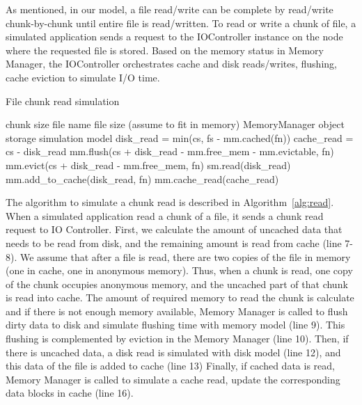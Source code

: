 \documentclass[conference]{IEEEtran}
\newcommand{\Desc}[2]{\State \makebox[2em][l]{#1}#2}
\begin{document}
			As mentioned, in our model, a file read/write can be complete by read/write 
			chunk-by-chunk until entire file is read/written.
			To read or write a chunk of file, a simulated application sends a request to the 
			IOController instance on the node where the requested file is stored.
			Based on the memory status in Memory Manager, the IOController 
			orchestrates cache and disk reads/writes, flushing, cache eviction 
			to simulate I/O time.
			
			\begin{algorithm}\caption{File chunk read simulation}\label{alg:read}
				\small
				\begin{algorithmic}[1]
					\Input
        				\Desc{cs}{chunk size}
        				\Desc{fn}{file name}
        				\Desc{fs}{file size (assume to fit in memory)}
						\Desc{mm}{MemoryManager object}
						\Desc{sm}{storage simulation model}
   					\EndInput
   					\State disk\_read = min(cs, fs - mm.cached(fn))
   					\State cache\_read = cs - disk\_read
					\State mm.flush(cs + disk\_read - mm.free\_mem - mm.evictable, fn) 
					\State mm.evict(cs + disk\_read - mm.free\_mem, fn) 
					  	
						\State sm.read(disk\_read)  
						\State mm.add\_to\_cache(disk\_read, fn) 	
					\EndIf
					 
						\State mm.cache\_read(cache\_read)  
					\EndIf
				\end{algorithmic}
			\end{algorithm}			
			
			The algorithm to simulate a chunk read is described in Algorithm~\ref{alg:read}.   
			When a simulated application read a chunk of a file, it sends a 
			chunk read request to IO Controller. 
			First, we calculate the amount of uncached data that needs to be read 
			from disk, and the remaining amount is read from cache (line 7-8).
			We assume that after a file is read, there are two copies of the file in memory 
			(one in cache, one in anonymous memory). 
			Thus, when a chunk is read, one copy of the chunk occupies anonymous memory, 
			and the uncached part of that chunk is read into cache.	
			The amount of required memory to read the chunk is calculate and 
			if there is not enough memory available, Memory Manager is called to 
			flush dirty data to disk and simulate flushing time with memory model (line 9).
			This flushing is complemented by eviction in the Memory Manager (line 10). 
			Then, if there is uncached data, a disk read is simulated with disk model (line 12), 
			and this data of the file is added to cache (line 13)
			Finally, if cached data is read, Memory Manager is called to simulate a cache read, 
			update the corresponding data blocks in cache (line 16). 
\end{document}
